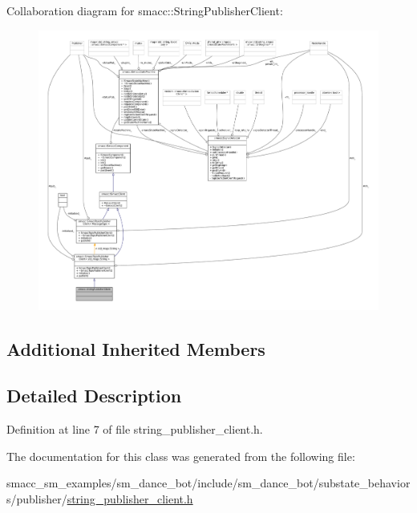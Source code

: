 Collaboration diagram for smacc\+:\+:String\+Publisher\+Client\+:
\nopagebreak
\begin{figure}[H]
\begin{center}
\leavevmode
\includegraphics[width=350pt]{classsmacc_1_1StringPublisherClient__coll__graph}
\end{center}
\end{figure}
\subsection*{Additional Inherited Members}


\subsection{Detailed Description}


Definition at line 7 of file string\+\_\+publisher\+\_\+client.\+h.



The documentation for this class was generated from the following file\+:\begin{DoxyCompactItemize}
\item 
smacc\+\_\+sm\+\_\+examples/sm\+\_\+dance\+\_\+bot/include/sm\+\_\+dance\+\_\+bot/substate\+\_\+behaviors/publisher/\hyperlink{string__publisher__client_8h}{string\+\_\+publisher\+\_\+client.\+h}\end{DoxyCompactItemize}
